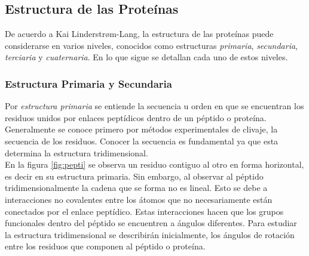 \subsection{Estructura de las Prote\'{i}nas}\label{ssec:Estruc}
De acuerdo a Kai Linderstr{\o}m-Lang, la estructura de las prote\'{i}nas puede considerarse en varios niveles, conocidos como estructuras \textit{primaria}, \textit{secundaria}, \textit{terciaria} y \textit{cuaternaria}. En lo que sigue se detallan cada uno de estos niveles.
\subsubsection{Estructura Primaria y Secundaria}
Por \textit{estructura primaria} se entiende la secuencia u orden en que se encuentran los residuos unidos por enlaces pept\'{i}dicos dentro de un p\'{e}ptido o prote\'{i}na. Generalmente se conoce primero por m\'{e}todos experimentales de clivaje, la secuencia de los residuos. Conocer la secuencia es fundamental ya que esta determina la estructura tridimensional.\\

En la figura \ref{fig:pepti} se observa un residuo contiguo al otro en forma horizontal, es decir en su estructura primaria. Sin embargo, al observar al p\'{e}ptido tridimensionalmente la cadena que se forma no es lineal. Esto se debe a interacciones no covalentes entre los \'{a}tomos que no necesariamente est\'{a}n conectados por el enlace pept\'{i}dico. Estas interacciones hacen que los grupos funcionales dentro del p\'{e}ptido se encuentren a \'{a}ngulos diferentes. Para estudiar la estructura tridimensional se describir\'{a}n inicialmente, los \'{a}ngulos de rotaci\'{o}n entre los residuos que componen al p\'{e}ptido o prote\'{i}na.\\


